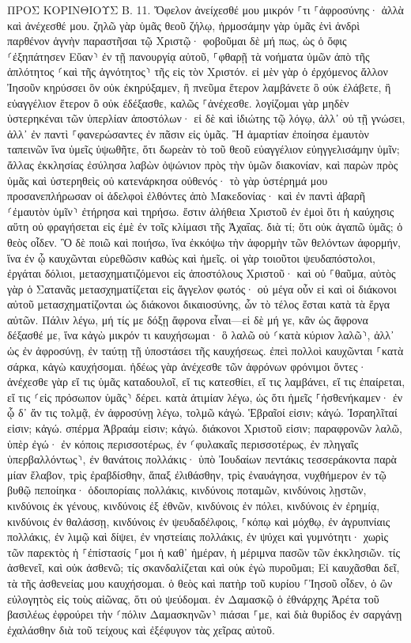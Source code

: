 \documentclass[twoside, 9pt]{extreport}
\begin{document}
ΠΡΟΣ ΚΟΡΙΝΘΙΟΥΣ Β.
11.
Ὄφελον ἀνείχεσθέ μου μικρόν ⸀τι ⸀ἀφροσύνης· ἀλλὰ καὶ ἀνέχεσθέ μου. 
ζηλῶ γὰρ ὑμᾶς θεοῦ ζήλῳ, ἡρμοσάμην γὰρ ὑμᾶς ἑνὶ ἀνδρὶ παρθένον ἁγνὴν παραστῆσαι τῷ Χριστῷ· 
φοβοῦμαι δὲ μή πως, ὡς ὁ ὄφις ⸂ἐξηπάτησεν Εὕαν⸃ ἐν τῇ πανουργίᾳ αὐτοῦ, ⸀φθαρῇ τὰ νοήματα ὑμῶν ἀπὸ τῆς ἁπλότητος ⸂καὶ τῆς ἁγνότητος⸃ τῆς εἰς τὸν Χριστόν. 
εἰ μὲν γὰρ ὁ ἐρχόμενος ἄλλον Ἰησοῦν κηρύσσει ὃν οὐκ ἐκηρύξαμεν, ἢ πνεῦμα ἕτερον λαμβάνετε ὃ οὐκ ἐλάβετε, ἢ εὐαγγέλιον ἕτερον ὃ οὐκ ἐδέξασθε, καλῶς ⸀ἀνέχεσθε. 
λογίζομαι γὰρ μηδὲν ὑστερηκέναι τῶν ὑπερλίαν ἀποστόλων· 
εἰ δὲ καὶ ἰδιώτης τῷ λόγῳ, ἀλλ᾽ οὐ τῇ γνώσει, ἀλλ᾽ ἐν παντὶ ⸀φανερώσαντες ἐν πᾶσιν εἰς ὑμᾶς. 
Ἢ ἁμαρτίαν ἐποίησα ἐμαυτὸν ταπεινῶν ἵνα ὑμεῖς ὑψωθῆτε, ὅτι δωρεὰν τὸ τοῦ θεοῦ εὐαγγέλιον εὐηγγελισάμην ὑμῖν; 
ἄλλας ἐκκλησίας ἐσύλησα λαβὼν ὀψώνιον πρὸς τὴν ὑμῶν διακονίαν, 
καὶ παρὼν πρὸς ὑμᾶς καὶ ὑστερηθεὶς οὐ κατενάρκησα οὐθενός· τὸ γὰρ ὑστέρημά μου προσανεπλήρωσαν οἱ ἀδελφοὶ ἐλθόντες ἀπὸ Μακεδονίας· καὶ ἐν παντὶ ἀβαρῆ ⸂ἐμαυτὸν ὑμῖν⸃ ἐτήρησα καὶ τηρήσω. 
ἔστιν ἀλήθεια Χριστοῦ ἐν ἐμοὶ ὅτι ἡ καύχησις αὕτη οὐ φραγήσεται εἰς ἐμὲ ἐν τοῖς κλίμασι τῆς Ἀχαΐας. 
διὰ τί; ὅτι οὐκ ἀγαπῶ ὑμᾶς; ὁ θεὸς οἶδεν. 
Ὃ δὲ ποιῶ καὶ ποιήσω, ἵνα ἐκκόψω τὴν ἀφορμὴν τῶν θελόντων ἀφορμήν, ἵνα ἐν ᾧ καυχῶνται εὑρεθῶσιν καθὼς καὶ ἡμεῖς. 
οἱ γὰρ τοιοῦτοι ψευδαπόστολοι, ἐργάται δόλιοι, μετασχηματιζόμενοι εἰς ἀποστόλους Χριστοῦ· 
καὶ οὐ ⸀θαῦμα, αὐτὸς γὰρ ὁ Σατανᾶς μετασχηματίζεται εἰς ἄγγελον φωτός· 
οὐ μέγα οὖν εἰ καὶ οἱ διάκονοι αὐτοῦ μετασχηματίζονται ὡς διάκονοι δικαιοσύνης, ὧν τὸ τέλος ἔσται κατὰ τὰ ἔργα αὐτῶν. 
Πάλιν λέγω, μή τίς με δόξῃ ἄφρονα εἶναι—εἰ δὲ μή γε, κἂν ὡς ἄφρονα δέξασθέ με, ἵνα κἀγὼ μικρόν τι καυχήσωμαι· 
ὃ λαλῶ οὐ ⸂κατὰ κύριον λαλῶ⸃, ἀλλ᾽ ὡς ἐν ἀφροσύνῃ, ἐν ταύτῃ τῇ ὑποστάσει τῆς καυχήσεως. 
ἐπεὶ πολλοὶ καυχῶνται ⸀κατὰ σάρκα, κἀγὼ καυχήσομαι. 
ἡδέως γὰρ ἀνέχεσθε τῶν ἀφρόνων φρόνιμοι ὄντες· 
ἀνέχεσθε γὰρ εἴ τις ὑμᾶς καταδουλοῖ, εἴ τις κατεσθίει, εἴ τις λαμβάνει, εἴ τις ἐπαίρεται, εἴ τις ⸂εἰς πρόσωπον ὑμᾶς⸃ δέρει. 
κατὰ ἀτιμίαν λέγω, ὡς ὅτι ἡμεῖς ⸀ἠσθενήκαμεν· ἐν ᾧ δ᾽ ἄν τις τολμᾷ, ἐν ἀφροσύνῃ λέγω, τολμῶ κἀγώ. 
Ἑβραῖοί εἰσιν; κἀγώ. Ἰσραηλῖταί εἰσιν; κἀγώ. σπέρμα Ἀβραάμ εἰσιν; κἀγώ. 
διάκονοι Χριστοῦ εἰσιν; παραφρονῶν λαλῶ, ὑπὲρ ἐγώ· ἐν κόποις περισσοτέρως, ἐν ⸂φυλακαῖς περισσοτέρως, ἐν πληγαῖς ὑπερβαλλόντως⸃, ἐν θανάτοις πολλάκις· 
ὑπὸ Ἰουδαίων πεντάκις τεσσεράκοντα παρὰ μίαν ἔλαβον, 
τρὶς ἐραβδίσθην, ἅπαξ ἐλιθάσθην, τρὶς ἐναυάγησα, νυχθήμερον ἐν τῷ βυθῷ πεποίηκα· 
ὁδοιπορίαις πολλάκις, κινδύνοις ποταμῶν, κινδύνοις λῃστῶν, κινδύνοις ἐκ γένους, κινδύνοις ἐξ ἐθνῶν, κινδύνοις ἐν πόλει, κινδύνοις ἐν ἐρημίᾳ, κινδύνοις ἐν θαλάσσῃ, κινδύνοις ἐν ψευδαδέλφοις, 
⸀κόπῳ καὶ μόχθῳ, ἐν ἀγρυπνίαις πολλάκις, ἐν λιμῷ καὶ δίψει, ἐν νηστείαις πολλάκις, ἐν ψύχει καὶ γυμνότητι· 
χωρὶς τῶν παρεκτὸς ἡ ⸀ἐπίστασίς ⸀μοι ἡ καθ᾽ ἡμέραν, ἡ μέριμνα πασῶν τῶν ἐκκλησιῶν. 
τίς ἀσθενεῖ, καὶ οὐκ ἀσθενῶ; τίς σκανδαλίζεται καὶ οὐκ ἐγὼ πυροῦμαι; 
Εἰ καυχᾶσθαι δεῖ, τὰ τῆς ἀσθενείας μου καυχήσομαι. 
ὁ θεὸς καὶ πατὴρ τοῦ κυρίου ⸀Ἰησοῦ οἶδεν, ὁ ὢν εὐλογητὸς εἰς τοὺς αἰῶνας, ὅτι οὐ ψεύδομαι. 
ἐν Δαμασκῷ ὁ ἐθνάρχης Ἁρέτα τοῦ βασιλέως ἐφρούρει τὴν ⸂πόλιν Δαμασκηνῶν⸃ πιάσαι ⸀με, 
καὶ διὰ θυρίδος ἐν σαργάνῃ ἐχαλάσθην διὰ τοῦ τείχους καὶ ἐξέφυγον τὰς χεῖρας αὐτοῦ. 
\end{document}

